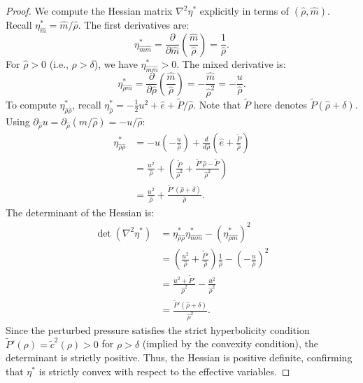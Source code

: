 \documentclass[10pt,a4paper]{amsart}
\newcommand{\pa}{\partial}
\begin{document}
\begin{proof}
We compute the Hessian matrix $\nabla^2 \eta^*$ explicitly in terms of $(\hat{\rho}, \hat{m})$.
Recall $\eta^*_{\hat{m}} = \hat{m}/\hat{\rho}$. The first derivatives are:
\[
    \eta^*_{\hat{m}\hat{m}} = \frac{\pa}{\pa \hat{m}}\left(\frac{\hat{m}}{\hat{\rho}}\right) = \frac{1}{\hat{\rho}}.
\]
For $\hat{\rho} > 0$ (i.e., $\rho > \delta$), we have $\eta^*_{\hat{m}\hat{m}} > 0$.
The mixed derivative is:
\[
    \eta^*_{\hat{\rho}\hat{m}} = \frac{\pa}{\pa \hat{\rho}}\left(\frac{\hat{m}}{\hat{\rho}}\right) = -\frac{\hat{m}}{\hat{\rho}^2} = -\frac{u}{\hat{\rho}}.
\]
To compute $\eta^*_{\hat{\rho}\hat{\rho}}$, recall $\eta^*_{\hat{\rho}} = -\frac{1}{2}u^2 + \hat{e} + \tilde{P}/\hat{\rho}$. Note that $\tilde{P}$ here denotes $\tilde{P}(\hat{\rho}+\delta)$.
Using $\pa_{\hat{\rho}} u = \pa_{\hat{\rho}}(\hat{m}/\hat{\rho}) = -u/\hat{\rho}$:
\begin{align*}
    \eta^*_{\hat{\rho}\hat{\rho}} &= -u \left(-\frac{u}{\hat{\rho}}\right) + \frac{d}{d\hat{\rho}}\left( \hat{e} + \frac{\tilde{P}}{\hat{\rho}} \right) \\
    &= \frac{u^2}{\hat{\rho}} + \left( \frac{\tilde{P}}{\hat{\rho}^2} + \frac{\tilde{P}'\hat{\rho} - \tilde{P}}{\hat{\rho}^2} \right) \\
    &= \frac{u^2}{\hat{\rho}} + \frac{\tilde{P}'(\hat{\rho}+\delta)}{\hat{\rho}}.
\end{align*}
The determinant of the Hessian is:
\begin{align*}
    \det(\nabla^2 \eta^*) &= \eta^*_{\hat{\rho}\hat{\rho}} \eta^*_{\hat{m}\hat{m}} - (\eta^*_{\hat{\rho}\hat{m}})^2 \\
    &= \left( \frac{u^2}{\hat{\rho}} + \frac{\tilde{P}'}{\hat{\rho}} \right) \frac{1}{\hat{\rho}} - \left( -\frac{u}{\hat{\rho}} \right)^2 \\
    &= \frac{u^2 + \tilde{P}'}{\hat{\rho}^2} - \frac{u^2}{\hat{\rho}^2} \\
    &= \frac{\tilde{P}'(\hat{\rho}+\delta)}{\hat{\rho}^2}.
\end{align*}
Since the perturbed pressure satisfies the strict hyperbolicity condition $\tilde{P}'(\rho) = \tilde{c}^2(\rho) > 0$ for $\rho > \delta$ (implied by the convexity condition), the determinant is strictly positive.
Thus, the Hessian is positive definite, confirming that $\eta^*$ is strictly convex with respect to the effective variables.
\end{proof}
\end{document}
